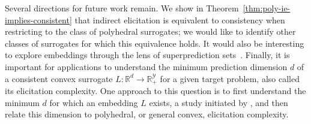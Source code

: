 \documentclass[11pt]{article}
\newcommand{\reals}{\mathbb{R}}
\newcommand{\Y}{\mathcal{Y}}
\begin{document}
Several directions for future work remain.
We show in Theorem~\ref{thm:poly-ie-implies-consistent} that indirect elicitation is equivalent to consistency when restricting to the class of polyhedral surrogates; we would like to identify other classes of surrogates for which this equivalence holds.
It would also be interesting to explore embeddings through the lens of superprediction sets~\citep{williamson2014geometry}.
Finally, it is important for applications to understand the minimum prediction dimension $d$ of a consistent convex surrogate $L:\reals^d\to \reals^\Y_+$ for a given target problem, also called its elicitation complexity.
One approach to this question is to first understand the minimum $d$ for which an embedding $L$ exists, a study initiated by \citet{finocchiaro2020embedding}, and then relate this dimension to polyhedral, or general convex, elicitation complexity.
\end{document}
